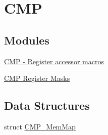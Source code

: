 \hypertarget{group___c_m_p___peripheral}{}\section{C\+M\+P}
\label{group___c_m_p___peripheral}
\subsection*{Modules}
\begin{DoxyCompactItemize}
\item 
\hyperlink{group___c_m_p___register___accessor___macros}{C\+M\+P -\/ Register accessor macros}
\item 
\hyperlink{group___c_m_p___register___masks}{C\+M\+P Register Masks}
\end{DoxyCompactItemize}
\subsection*{Data Structures}
\begin{DoxyCompactItemize}
\item 
struct \hyperlink{struct_c_m_p___mem_map}{C\+M\+P\+\_\+\+Mem\+Map}
\end{DoxyCompactItemize}
